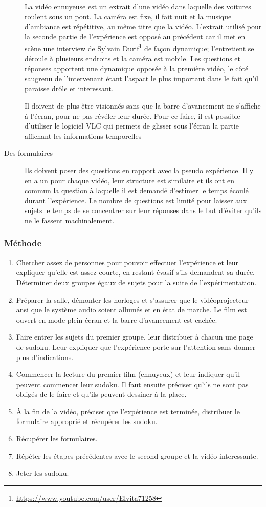 \documentclass[12pt,fleqn,oneside,openany]{book} %
\begin{document}
\begin{description}
	La vidéo ennuyeuse est un extrait d'une vidéo dans laquelle des voitures roulent sous un pont. La caméra est fixe, il fait nuit et la musique d'ambiance est répétitive, au même titre que la vidéo. L'extrait utilisé pour la seconde partie de l'expérience est opposé au précédent car il met en scène une interview de Sylvain Durif\footnote{\url{https://www.youtube.com/user/Elvita71258}} de façon dynamique; l'entretient se déroule à plusieurs endroits et la caméra est mobile. Les questions et réponses apportent une dynamique opposée à la première vidéo, le côté saugrenu de l'intervenant étant l'aspact le plus important dans le fait qu'il paraisse drôle et interessant. 

	Il doivent de plus être visionnés sans que la barre d'avancement ne s'affiche à l'écran, pour ne pas révéler leur durée. Pour ce faire, il est possible d'utiliser le logiciel VLC qui permets de glisser sous l'écran la partie affichant les informations temporelles
	\item[Des formulaires] Ils doivent poser des questions en rapport avec la pseudo expérience. Il y en a un pour chaque vidéo, leur structure est similaire et ils ont en commun la question à laquelle il est demandé d'estimer le temps écoulé durant l'expérience. Le nombre de questions est limité pour laisser aux sujets le temps de se concentrer sur leur réponses dans le but d'éviter qu'ils ne le fassent machinalement.
\end{description}

\subsubsection{Méthode} \label{sssec:methode1}
\begin{enumerate}
	\item Chercher assez de personnes pour pouvoir effectuer l'expérience et leur expliquer qu'elle est assez courte, en restant évasif s'ils demandent sa durée. Déterminer deux groupes égaux de sujets pour la suite de l'expérimentation.
	\item Préparer la salle, démonter les horloges et s'assurer que le vidéoprojecteur ansi que le système audio soient allumés et en état de marche. Le film est ouvert en mode plein écran et la barre d'avancement est cachée.
	\item Faire entrer les sujets du premier groupe, leur distribuer à chacun une page de sudoku. Leur expliquer que l'expérience porte sur l'attention sans donner plus d'indications. 
	\item Commencer la lecture du premier film (ennuyeux) et leur indiquer qu'il peuvent commencer leur sudoku. Il faut ensuite préciser qu'ils ne sont pas obligés de le faire et qu'ils peuvent dessiner à la place. 
	\item À la fin de la vidéo, préciser que l'expérience est terminée, distribuer le formulaire approprié et récupérer les sudoku.
	\item Récupérer les formulaires.
	\item Répéter les étapes précédentes avec le second groupe et la vidéo interessante.
	\item Jeter les sudoku.
\end{enumerate}
\end{document}
